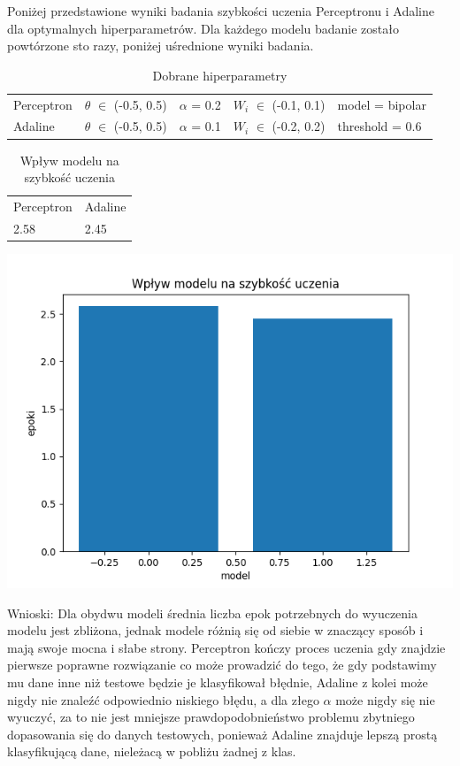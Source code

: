 \documentclass{article}
\begin{document}
Poniżej przedstawione wyniki badania szybkości uczenia Perceptronu i Adaline dla optymalnych hiperparametrów. Dla każdego modelu badanie zostało powtórzone sto razy, poniżej uśrednione wyniki badania.\\

\begin{table}[h]
  \centering
  \caption{Dobrane hiperparametry}
  \begin{tabular}{lllll}
    \toprule
    Perceptron & $\theta$ $\in$ (-0.5, 0.5) & $\alpha$ = 0.2 & $W_i$ $\in$ (-0.1, 0.1) & model = bipolar  \\
    Adaline & $\theta$ $\in$ (-0.5, 0.5) & $\alpha$ = 0.1 & $W_i$ $\in$ (-0.2, 0.2) & threshold = 0.6\\
    \bottomrule
  \end{tabular}
\end{table}

\begin{table}[h]
  \centering
  \caption{Wpływ modelu na szybkość uczenia}
  \begin{tabular}{ll}
    \toprule
    Perceptron & Adaline \\
    2.58 & 2.45 \\
    \bottomrule
  \end{tabular}
\end{table}


\begin{center}
\includegraphics[scale=0.8]{ada_exp4.png}
\end{center}

Wnioski: Dla obydwu modeli średnia liczba epok potrzebnych do wyuczenia modelu jest zbliżona, jednak modele różnią się od siebie w znaczący sposób i mają swoje mocna i słabe strony. Perceptron kończy proces uczenia gdy znajdzie pierwsze poprawne rozwiązanie co może prowadzić do tego, że gdy podstawimy mu dane inne niż testowe będzie je klasyfikował błędnie, Adaline z kolei może nigdy nie znaleźć odpowiednio niskiego błędu, a dla złego $\alpha$ może nigdy się nie wyuczyć, za to nie jest mniejsze prawdopodobnieństwo problemu zbytniego dopasowania się do danych testowych, ponieważ Adaline znajduje lepszą prostą klasyfikującą dane, nieleżacą w pobliżu żadnej z klas.
\end{document}
